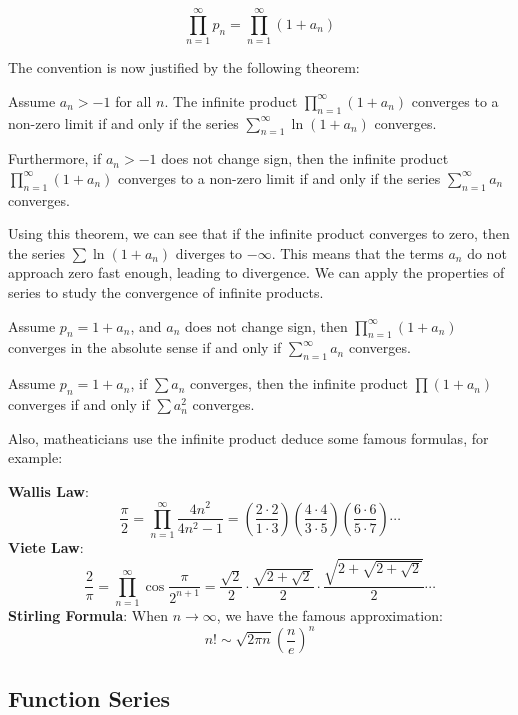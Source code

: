 \[
\prod_{n=1}^{\infty} p_n = \prod_{n=1}^{\infty} (1 + a_n)
\]

The convention is now justified by the following theorem:

\begin{theorem}
    Assume $a_n > -1$ for all $n$. The infinite product $\prod_{n=1}^{\infty} (1 + a_n)$ converges to a non-zero limit if and only if the series $\sum_{n=1}^{\infty} \ln(1 + a_n)$ converges.
    
    Furthermore, if $a_n > -1$ does not change sign, then the infinite product $\prod_{n=1}^{\infty} (1 + a_n)$ converges to a non-zero limit if and only if the series $\sum_{n=1}^{\infty} a_n$ converges.
\end{theorem}

Using this theorem, we can see that if the infinite product converges to zero, then the series $\sum \ln(1 + a_n)$ diverges to $-\infty$. This means that the terms $a_n$ do not approach zero fast enough, leading to divergence. We can apply the properties of series to study the convergence of infinite products.

\begin{corollary}
    Assume $p_n = 1 + a_n$, and $a_n$ does not change sign, then $\prod_{n=1}^{\infty} (1+a_n)$ converges in the absolute sense if and only if $\sum_{n=1}^{\infty} a_n$ converges.
\end{corollary}

\begin{corollary}
    Assume $p_n = 1 + a_n$, if $\sum a_n$ converges, then the infinite product $\prod (1+a_n)$ converges if and only if $\sum a_n^2$ converges.
\end{corollary}

Also, matheaticians use the infinite product deduce some famous formulas, for example:

\textbf{Wallis Law}:
\[\frac{\pi}{2} = \prod_{n=1}^{\infty} \frac{4n^2}{4n^2 - 1} = \left(\frac{2 \cdot 2}{1 \cdot 3}\right) \left(\frac{4 \cdot 4}{3 \cdot 5}\right) \left(\frac{6 \cdot 6}{5 \cdot 7}\right) \cdots\]
\textbf{Viete Law}:
\[\frac{2}{\pi} = \prod_{n=1}^{\infty} \cos \frac{\pi}{2^{n+1}} = \frac{\sqrt{2}}{2} \cdot \frac{\sqrt{2 + \sqrt{2}}}{2} \cdot \frac{\sqrt{2 + \sqrt{2 + \sqrt{2}}}}{2} \cdots\]
\textbf{Stirling Formula}:
When $n \to \infty$, we have the famous approximation:
\[n! \sim \sqrt{2\pi n}\left(\frac{n}{e}\right)^n\]


\subsection{Function Series}

